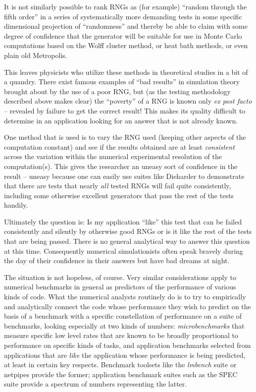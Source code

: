 \documentclass{book}
\begin{document}
It is not similarly possible to rank RNGs as (for example) ``random
through the fifth order'' in a series of systematically more demanding
tests in some specific dimensional projection of ``randomness'' and
thereby be able to claim with some degree of confidence that the
generator will be suitable for use in Monte Carlo computations based on
the Wolff cluster method\cite{Wolff}, or heat bath
methods\cite{BinderHeerman}, or even plain old
Metropolis\cite{Metropolis}.  

This leaves physicists who utilize these methods in theoretical studies
in a bit of a quandry.  There exist famous examples of ``bad results''
in simulation theory brought about by the use of a poor RNG, but (as the
testing methodology described above makes clear) the ``poverty'' of a
RNG is known only {\em ex post facto} -- revealed by failure to get the
correct result!  This makes its quality difficult to determine in an
application looking for an answer that is not already known.

One method that is used is to vary the RNG used (keeping other aspects
of the computation constant) and see if the results obtained are at
least {\em consistent} across the variation within the numerical
experimental resolution of the computation(s).  This gives the
researcher an uneasy sort of confidence in the result -- uneasy because
one can easily use suites like Dieharder to demonstrate that there are
tests that nearly {\em all} tested RNGs will fail quite consistently,
including some otherwise excellent generators that pass the rest of the
tests handily.  

Ultimately the question is:  Is my application ``like'' this test that
can be failed consistently and silently by otherwise good RNGs or is it
like the rest of the tests that are being passed.  There is no general
analytical way to answer this question at this time.  Consequently
numerical simulationists often speak bravely during the day of their
confidence in their answers but have bad dreams at night.

The situation is not hopeless, of course.  Very similar considerations
apply to numerical benchmarks in general as predictors of the
performance of various kinds of code.  What the numerical analysts
routinely do is to try to empirically and analytically connect the code
whose performance they wish to predict on the basis of a benchmark with
a specific constellation of performance on a suite of benchmarks,
looking especially at two kinds of numbers:  {\em microbenchmarks} that
measure specific low level rates that are known to be broadly
proportional to performance on specific kinds of tasks, and application
benchmarks selected from applications that are {\em like} the
application whose performance is being predicted, at least in certain
key respects.  Benchmark toolsets like the {\em lmbench}
suite\cite{McVoy} or netpipes\cite{netpipe} provide the former;
application benchmark suites such as the SPEC suite\cite{SPEC} provide a
spectrum of numbers representing the latter.
\end{document}
